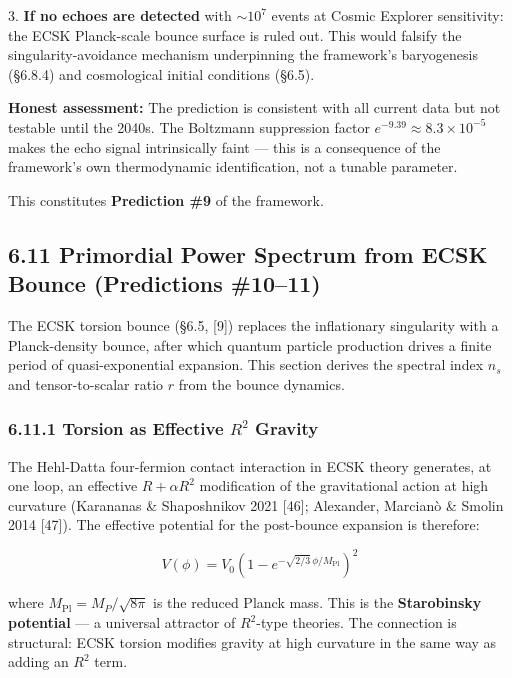\documentclass[11pt,a4paper]{article}
\theoremstyle{definition}
\theoremstyle{remark}
\begin{document}
3. \textbf{If no echoes are detected} with $\sim 10^7$ events at Cosmic Explorer sensitivity: the ECSK Planck-scale bounce surface is ruled out. This would falsify the singularity-avoidance mechanism underpinning the framework's baryogenesis (\S 6.8.4) and cosmological initial conditions (\S 6.5).

\textbf{Honest assessment:} The prediction is consistent with all current data but not testable until the 2040s. The Boltzmann suppression factor $e^{-9.39} \approx 8.3 \times 10^{-5}$ makes the echo signal intrinsically faint — this is a consequence of the framework's own thermodynamic identification, not a tunable parameter.

This constitutes \textbf{Prediction \#9} of the framework.

\subsection{6.11 Primordial Power Spectrum from ECSK Bounce (Predictions \#10–11)}

The ECSK torsion bounce (\S 6.5, [9]) replaces the inflationary singularity with a Planck-density bounce, after which quantum particle production drives a finite period of quasi-exponential expansion. This section derives the spectral index $n_s$ and tensor-to-scalar ratio $r$ from the bounce dynamics.

\subsubsection{6.11.1 Torsion as Effective $R^2$ Gravity}

The Hehl-Datta four-fermion contact interaction in ECSK theory generates, at one loop, an effective $R + \alpha R^2$ modification of the gravitational action at high curvature (Karananas \& Shaposhnikov 2021 [46]; Alexander, Marcianò \& Smolin 2014 [47]). The effective potential for the post-bounce expansion is therefore:


\begin{equation}
V(\phi) = V_0 \left(1 - e^{-\sqrt{2/3}\,\phi/M_{\text{Pl}}}\right)^2
\end{equation}


where $M_{\text{Pl}} = M_P / \sqrt{8\pi}$ is the reduced Planck mass. This is the \textbf{Starobinsky potential} — a universal attractor of $R^2$-type theories. The connection is structural: ECSK torsion modifies gravity at high curvature in the same way as adding an $R^2$ term.
\end{document}
